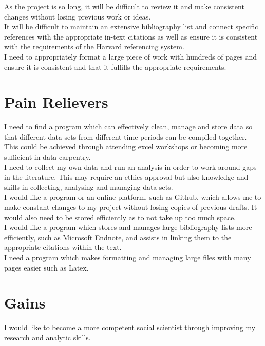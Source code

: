 \documentclass{article}
\begin{document}
As the project is so long, it will be difficult to review it and make consistent changes without losing previous work or ideas.\\

It will be difficult to maintain an extensive bibliography list and connect specific references with the appropriate in-text citations as well as ensure it is consistent with the requirements of the Harvard referencing system. \\

I need to appropriately format a large piece of work with hundreds of pages and ensure it is consistent and that it fulfills the appropriate requirements. \\

\section {Pain Relievers}
I need to find a program which can effectively clean, manage and store data so that different data-sets from different time periods can be compiled together. This could be achieved through attending excel workshops or becoming more sufficient in data carpentry.\\

I need to collect my own data and run an analysis in order to work around gaps in the literature. This may require an ethics approval but also knowledge and skills in collecting, analysing and managing data sets. \\

I would like a program or an online platform, such as Github, which allows me to make constant changes to my project without losing copies of previous drafts. It would also need to be stored efficiently as to not take up too much space. \\

I would like a program which stores and manages large bibliography lists more efficiently, such as Microsoft Endnote, and assists in linking them to the appropriate citations within the text. \\

I need a program which makes formatting and managing large files with many pages easier such as Latex. 

\section{Gains}
I would like to become a more competent social scientist through improving my research and analytic skills. \\
\end{document}
